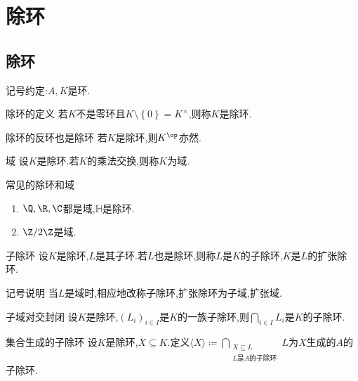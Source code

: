 \chapter{除环}

\section{除环}

记号约定:$A,K$是环.

\begin{definition}{除环的定义}{}
	若$K$不是零环且$K\setminus\left\{0\right\}=K^{\times}$,则称$K$是除环.
\end{definition}

\begin{proposition}{除环的反环也是除环}{}
	若$K$是除环,则$K^{\op}$亦然.
\end{proposition}

\begin{definition}{域}{}
	设$K$是除环.若$K$的乘法交换,则称$K$为域.
\end{definition}

\begin{example}{常见的除环和域}{}
	\begin{enumerate}
		\item $\Q,\R,\C$都是域,$\mathbb{H}$是除环.
		\item $\Z/2\Z$是域.
	\end{enumerate}
\end{example}

\begin{definition}{子除环}{}
	设$K$是除环,$L$是其子环.若$L$也是除环,则称$L$是$K$的子除环,$K$是$L$的扩张除环.
\end{definition}

\begin{remark}{记号说明}{}
	当$L$是域时,相应地改称子除环,扩张除环为子域,扩张域.
\end{remark}

\begin{proposition}{子域对交封闭}{}
	设$K$是除环,$\left(L_{i}\right)_{i\in I}$是$K$的一族子除环,则$\bigcap\limits_{i\in I}L_{i}$是$K$的子除环.
\end{proposition}

\begin{definition}{集合生成的子除环}{}
	设$K$是除环,$X\subseteq K$.定义$\langle X\rangle\coloneq\bigcap\limits_{\substack{X\subseteq L\\L\text{是}A\text{的子除环}}}L$为$X$生成的$A$的子除环.
\end{definition}


